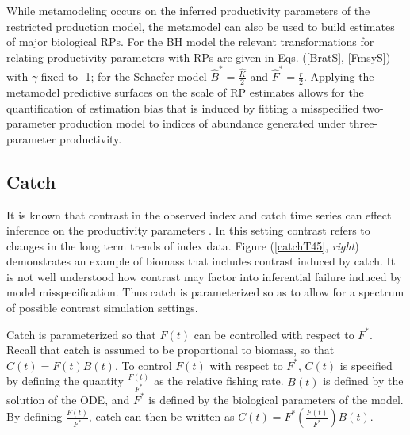 %
{\color{red}
While metamodeling occurs on the inferred productivity parameters of the
restricted production model, the metamodel can also be used to build
estimates of major biological RPs. For the BH model the relevant
transformations for relating productivity parameters with RPs are given in
Eqs. (\ref{BratS}, \ref{FmsyS}) with $\gamma$ fixed to -1; for the Schaefer
model $\hat B^*=\frac{\hat K}{2}$ and $\hat F^*=\frac{\hat r}{2}$.
%
Applying the metamodel predictive surfaces on the scale of RP estimates allows for the
quantification of estimation bias that is induced by fitting a misspecified two-parameter
production model to indices of abundance generated under three-parameter productivity.
}

%
\subsection{Catch \label{catch}}


%
It is known that contrast in the observed index and catch time series %
can effect inference on the productivity parameters \cite{hilborn_quantitative_1992}. %
In this setting contrast refers to changes in the long term trends of index data.
Figure (\ref{catchT45}, \emph{right}) demonstrates an example of biomass that
includes contrast induced by catch. It is not well understood how contrast may
factor into inferential failure induced by model misspecification. Thus catch
is parameterized so as to allow for a spectrum of possible contrast simulation settings.

%
Catch is parameterized so that $F(t)$ can be controlled with respect to $F^*$.
Recall that catch is assumed to be proportional to biomass, so that $C(t)=F(t)B(t)$.
To control $F(t)$ with respect to $F^*$, $C(t)$ is specified by defining the
quantity $\frac{F(t)}{F^*}$ as the relative fishing rate. $B(t)$ is defined
by the solution of the ODE, and $F^*$ is defined by the biological parameters
of the model. By defining $\frac{F(t)}{F^*}$, catch can then be written as
\mbox{$C(t)=F^*\left(\frac{F(t)}{F^*}\right)B(t)$.}

